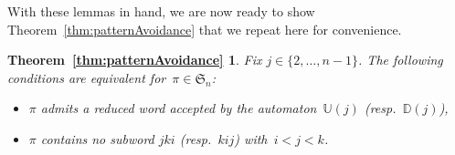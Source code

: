 \documentclass[ALCO]{cedram}
\newcommand{\fS}{\mathfrak{S}}
\newcommand{\automatonU}{\mathbb{U}}
\newcommand{\automatonD}{\mathbb{D}}
\begin{document}
With these lemmas in hand, we are now ready to show Theorem~\ref{thm:patternAvoidance} that we repeat here for convenience.

\newtheorem*{thm:patternAvoidance}{Theorem~\ref{thm:patternAvoidance}}
\begin{thm:patternAvoidance}
Fix $j \in \{2, \dots, n-1\}$.
The following conditions are equivalent for~${\pi \in \fS_n}$:
\begin{itemize}
	\item $\pi$ admits a reduced word accepted by the automaton~$\automatonU(j)$ (resp.~$\automatonD(j)$),
	\item $\pi$ contains no subword $jki$ (resp.~$kij$) with~$i < j < k$.
\end{itemize}
\end{thm:patternAvoidance}
\end{document}
